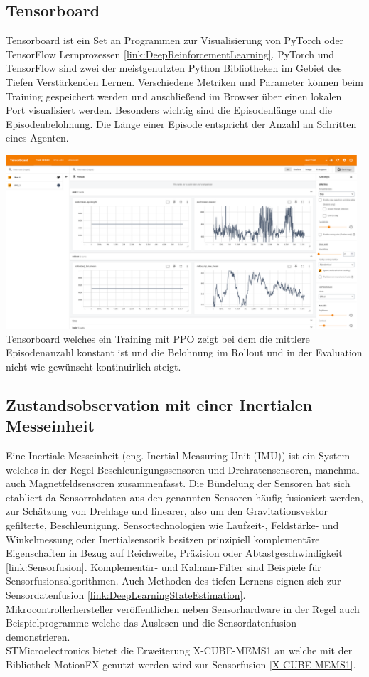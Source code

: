 \subsection{\label{tensorboard}Tensorboard}
Tensorboard ist ein Set an Programmen zur Visualisierung von PyTorch oder TensorFlow Lernprozessen \ref{link:DeepReinforcementLearning}. PyTorch und TensorFlow sind zwei der meistgenutzten Python Bibliotheken im Gebiet des Tiefen Verstärkenden Lernen. Verschiedene Metriken und Parameter können beim Training gespeichert werden und anschließend im Browser über einen lokalen Port visualisiert werden. Besonders wichtig sind die Episodenlänge und die Episodenbelohnung. Die Länge einer Episode entspricht der Anzahl an Schritten eines Agenten. 
\begin{center}
	\includegraphics[width=0.98\textwidth, keepaspectratio]{../images/0058 Tensorboard.png}{\\Tensorboard welches ein Training mit PPO zeigt bei dem die mittlere Episodenanzahl konstant ist und die Belohnung im Rollout und in der Evaluation nicht wie gewünscht kontinuirlich steigt.}
\end{center}

\subsection{Zustandsobservation mit einer Inertialen Messeinheit}
Eine Inertiale Messeinheit (eng. Inertial Measuring Unit (IMU)) ist ein System welches in der Regel Beschleunigungssensoren und Drehratensensoren, manchmal auch Magnetfeldsensoren zusammenfasst. Die Bündelung der Sensoren hat sich etabliert da Sensorrohdaten aus den genannten Sensoren häufig fusioniert werden, zur Schätzung von Drehlage und linearer, also um den Gravitationsvektor gefilterte, Beschleunigung. Sensortechnologien wie Laufzeit-, Feldstärke- und Winkelmessung oder Inertialsensorik besitzen prinzipiell komplementäre Eigenschaften in Bezug auf Reichweite, Präzision oder Abtastgeschwindigkeit \ref{link:Sensorfusion}.
Komplementär- und Kalman-Filter sind Beispiele für Sensorfusionsalgorithmen. Auch Methoden des tiefen Lernens eignen sich zur Sensordatenfusion \ref{link:DeepLearningStateEstimation}.\\
Mikrocontrollerhersteller veröffentlichen neben Sensorhardware in der Regel auch Beispielprogramme welche das Auslesen und die Sensordatenfusion demonstrieren.\\
STMicroelectronics bietet die Erweiterung X-CUBE-MEMS1 an welche mit der Bibliothek MotionFX genutzt werden wird zur Sensorfusion \ref{X-CUBE-MEMS1}.


